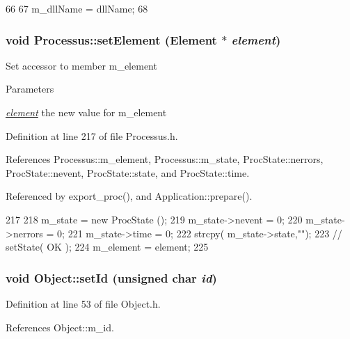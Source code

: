 \begin{DoxyCode}
66                                       {
67     m_dllName = dllName;
68   }
\end{DoxyCode}
\hypertarget{classProcessus_a8ddef94227d83d9dae2cd49aebc33353}{
\subsubsection[{setElement}]{\setlength{\rightskip}{0pt plus 5cm}void Processus::setElement ({\bf Element} $\ast$ {\em element})}}
\label{classProcessus_a8ddef94227d83d9dae2cd49aebc33353}
Set accessor to member m\_\-element 
\begin{DoxyParams}{Parameters}
\item[{\em \hyperlink{namespaceelement}{element}}]the new value for m\_\-element \end{DoxyParams}


Definition at line 217 of file Processus.h.

References Processus::m\_\-element, Processus::m\_\-state, ProcState::nerrors, ProcState::nevent, ProcState::state, and ProcState::time.

Referenced by export\_\-proc(), and Application::prepare().


\begin{DoxyCode}
217                                      {
218     m_state = new ProcState ();
219     m_state->nevent  = 0;
220     m_state->nerrors = 0;
221     m_state->time    = 0;
222     strcpy( m_state->state,"");
223     //  setState( OK );
224     m_element = element;
225   }
\end{DoxyCode}
\hypertarget{classObject_a398fe08cba594a0ce6891d59fe4f159f}{
\subsubsection[{setId}]{\setlength{\rightskip}{0pt plus 5cm}void Object::setId (unsigned char {\em id})}}
\label{classObject_a398fe08cba594a0ce6891d59fe4f159f}


Definition at line 53 of file Object.h.

References Object::m\_\-id.

